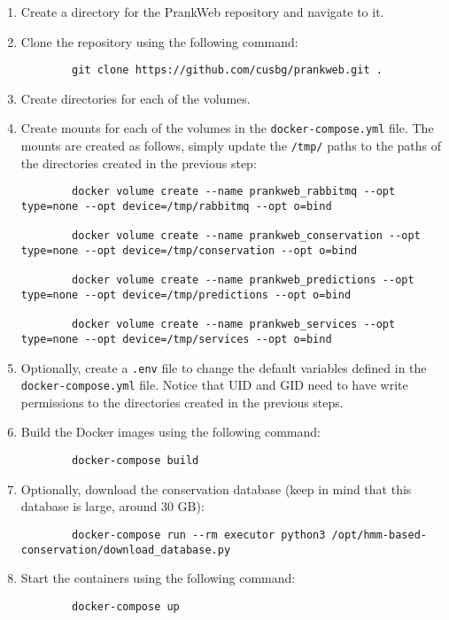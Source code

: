 \begin{enumerate}
    \item Create a directory for the PrankWeb repository and navigate to it.
    \item Clone the repository using the following command:
    \begin{lstlisting}
        git clone https://github.com/cusbg/prankweb.git .
    \end{lstlisting}
    \item Create directories for each of the volumes.
    \item Create mounts for each of the volumes in the \texttt{docker-compose.yml} file. The mounts are created as follows, simply update the \texttt{/tmp/} paths to the paths of the directories created in the previous step:
    \begin{lstlisting}
        docker volume create --name prankweb_rabbitmq --opt type=none --opt device=/tmp/rabbitmq --opt o=bind

        docker volume create --name prankweb_conservation --opt type=none --opt device=/tmp/conservation --opt o=bind

        docker volume create --name prankweb_predictions --opt type=none --opt device=/tmp/predictions --opt o=bind

        docker volume create --name prankweb_services --opt type=none --opt device=/tmp/services --opt o=bind
    \end{lstlisting}
    \item Optionally, create a \texttt{.env} file to change the default variables defined in the \texttt{docker-compose.yml} file. Notice that UID and GID need to have write permissions to the directories created in the previous steps.
    \item Build the Docker images using the following command:
    \begin{lstlisting}
        docker-compose build
    \end{lstlisting}
    \item Optionally, download the conservation database (keep in mind that this database is large, around 30 GB):
    \begin{lstlisting}
        docker-compose run --rm executor python3 /opt/hmm-based-conservation/download_database.py
    \end{lstlisting}
    \item Start the containers using the following command:
    \begin{lstlisting}
        docker-compose up
    \end{lstlisting}
\end{enumerate}

